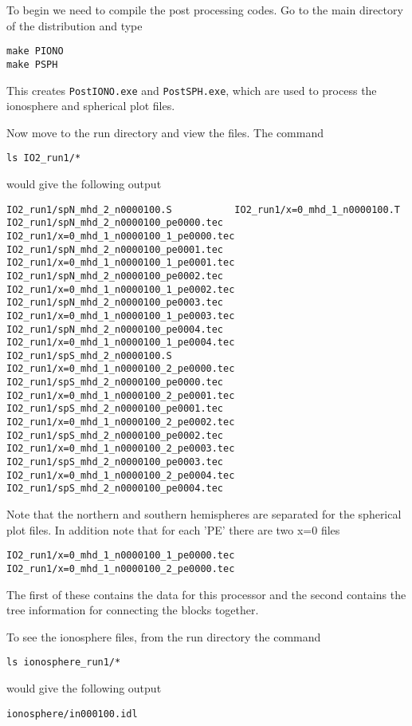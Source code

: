 To begin we need to compile the post processing codes.  Go to the main
directory of the distribution and type
\begin{verbatim}
make PIONO
make PSPH
\end{verbatim}
This creates {\tt PostIONO.exe} and {\tt PostSPH.exe}, which are used
to process the ionosphere and spherical plot files.

Now move to the run directory and view the files.  The command
\begin{verbatim}
ls IO2_run1/* 
\end{verbatim}
would give the following output
\begin{verbatim}
IO2_run1/spN_mhd_2_n0000100.S           IO2_run1/x=0_mhd_1_n0000100.T
IO2_run1/spN_mhd_2_n0000100_pe0000.tec  IO2_run1/x=0_mhd_1_n0000100_1_pe0000.tec
IO2_run1/spN_mhd_2_n0000100_pe0001.tec  IO2_run1/x=0_mhd_1_n0000100_1_pe0001.tec
IO2_run1/spN_mhd_2_n0000100_pe0002.tec  IO2_run1/x=0_mhd_1_n0000100_1_pe0002.tec
IO2_run1/spN_mhd_2_n0000100_pe0003.tec  IO2_run1/x=0_mhd_1_n0000100_1_pe0003.tec
IO2_run1/spN_mhd_2_n0000100_pe0004.tec  IO2_run1/x=0_mhd_1_n0000100_1_pe0004.tec
IO2_run1/spS_mhd_2_n0000100.S           IO2_run1/x=0_mhd_1_n0000100_2_pe0000.tec
IO2_run1/spS_mhd_2_n0000100_pe0000.tec  IO2_run1/x=0_mhd_1_n0000100_2_pe0001.tec
IO2_run1/spS_mhd_2_n0000100_pe0001.tec  IO2_run1/x=0_mhd_1_n0000100_2_pe0002.tec
IO2_run1/spS_mhd_2_n0000100_pe0002.tec  IO2_run1/x=0_mhd_1_n0000100_2_pe0003.tec
IO2_run1/spS_mhd_2_n0000100_pe0003.tec  IO2_run1/x=0_mhd_1_n0000100_2_pe0004.tec
IO2_run1/spS_mhd_2_n0000100_pe0004.tec  
\end{verbatim}
Note that the northern and southern hemispheres are separated for 
the spherical plot files.  In addition note that for each 'PE' there
are two x=0 files
\begin{verbatim}
IO2_run1/x=0_mhd_1_n0000100_1_pe0000.tec
IO2_run1/x=0_mhd_1_n0000100_2_pe0000.tec
\end{verbatim}
The first of these contains the data for this processor and the second
contains the tree information for connecting the blocks together.

To see the ionosphere files, from the run directory the command
\begin{verbatim}
ls ionosphere_run1/* 
\end{verbatim}
would give the following output
\begin{verbatim}
ionosphere/in000100.idl  
\end{verbatim}

